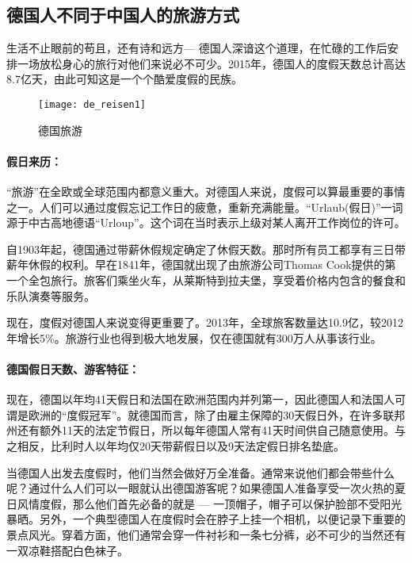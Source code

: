 \subsection{德国人不同于中国人的旅游方式}

生活不止眼前的苟且，还有诗和远方--- 德国人深谙这个道理，在忙碌的工作后安排一场放松身心的旅行对他们来说必不可少。2015年，德国人的度假天数总计高达8.7亿天，由此可知这是一个个酷爱度假的民族。

\begin{figure}
    \centering
    \texttt{[image: de\_reisen1]}
    \caption{德国旅游}
\end{figure}
\paragraph{假日来历：}

“旅游”在全欧或全球范围内都意义重大。对德国人来说，度假可以算最重要的事情之一。人们可以通过度假忘记工作日的疲惫，重新充满能量。“Urlaub(假日)”一词源于中古高地德语“Urloup”。这个词在当时表示上级对某人离开工作岗位的许可。

自1903年起，德国通过带薪休假规定确定了休假天数。那时所有员工都享有三日带薪年休假的权利。早在1841年，德国就出现了由旅游公司Thomas Cook提供的第一个全包旅行。旅客们乘坐火车，从莱斯特到拉夫堡，享受着价格内包含的餐食和乐队演奏等服务。

现在，度假对德国人来说变得更重要了。2013年，全球旅客数量达10.9亿，较2012年增长5\%。旅游行业也得到极大地发展，仅在德国就有300万人从事该行业。



\paragraph{德国假日天数、游客特征：}

现在，德国以年均41天假日和法国在欧洲范围内并列第一，因此德国人和法国人可谓是欧洲的“度假冠军”。就德国而言，除了由雇主保障的30天假日外，在许多联邦州还有额外11天的法定节假日，所以每年德国人常有41天时间供自己随意使用。与之相反，比利时人以年均仅20天带薪假日以及9天法定假日排名垫底。

当德国人出发去度假时，他们当然会做好万全准备。通常来说他们都会带些什么呢？通过什么人们可以一眼就认出德国游客呢？如果德国人准备享受一次火热的夏日风情度假，那么他们首先必备的就是 --- 一顶帽子，帽子可以保护脸部不受阳光暴晒。另外，一个典型德国人在度假时会在脖子上挂一个相机，以便记录下重要的景点风光。穿着方面，他们通常会穿一件衬衫和一条七分裤，必不可少的当然还有一双凉鞋搭配白色袜子。

